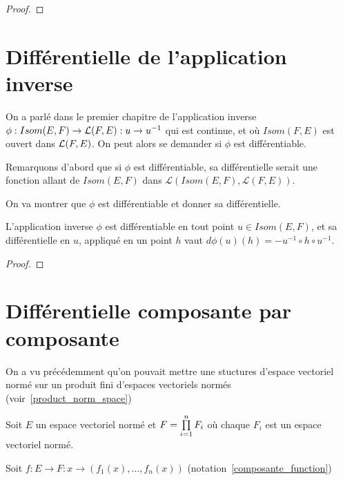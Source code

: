 \begin{proof}
	
\end{proof}

\section{Différentielle de l'application inverse}

On a parlé dans le premier chapitre de l'application inverse
$\phi : Isom(E, F) \rightarrow \mathcal{L}(F, E) : u \rightarrow
u^{-1}$ qui est continue, et où $Isom(F, E)$ est ouvert dans
$\mathcal{L}(F, E)$.
On peut alors se demander si $\phi$ est différentiable.

Remarquons d'abord que si $\phi$ est différentiable, sa différentielle serait
une fonction allant de $Isom(E, F)$ dans $\mathcal{L}(Isom(E, F), \mathcal{L}(F,
E))$.

On va montrer que $\phi$ est différentiable et donner sa différentielle.

\begin{theorem}
\label{differential_inverse_application}
	L'application inverse $\phi$ est différentiable en tout point $u \in Isom(E,
	F)$, et sa différentielle en $u$, appliqué en un point $h$ vaut $d\phi(u)(h)
	= -u^{-1} \circ h \circ u^{-1}$.
\end{theorem}

\begin{proof}
	
\end{proof}

\section{Différentielle composante par composante}
\label{section_differential_composante}


On a vu précédemment qu'on pouvait mettre une stuctures d'espace vectoriel
normé sur un produit fini d'espaces vectoriels normés (voir~\ref{product_norm_space})

Soit $E$ un espace vectoriel normé et $F = \prod\limits_{i = 1}^{n} F_{i}$ où chaque 
$F_{i}$ est un espace vectoriel normé.

Soit $f : E \rightarrow F : x \rightarrow (f_{1}(x), \ldots, f_{n}(x))$
(notation~\ref{composante_function})

